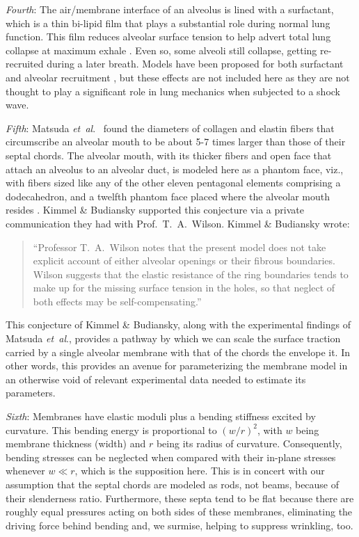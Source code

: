 \textit{Fourth\/}: The air\slash membrane interface of an alveolus is lined with a surfactant, which is a thin bi-lipid film that plays a substantial role during normal lung function.  This film reduces alveolar surface tension to help advert total lung collapse at maximum exhale \cite{Stamenovic90}.  Even so, some alveoli still collapse, getting re-recruited during a later breath.  Models have been proposed for both surfactant \cite{Hills99} and alveolar recruitment \cite{Bates07}, but these effects are not included here as they are not thought to play a significant role in lung mechanics when subjected to a shock wave. 

\textit{Fifth\/}: Matsuda \textit{et~al}.\ \cite{Matsudaetal87} found the diameters of collagen and elastin fibers that circumscribe an alveolar mouth to be about 5-7 times larger than those of their septal chords.  The alveolar mouth, with its thicker fibers and open face that attach an alveolus to an alveolar duct, is modeled here as a phantom face, viz., with fibers sized like any of the other eleven pentagonal elements comprising a dodecahedron, and a twelfth phantom face placed where the alveolar mouth resides \cite{Freedetal12}.  Kimmel \& Budiansky supported this conjecture via a private communication they had with Prof.\ T.\ A.\ Wilson.  Kimmel \& Budiansky wrote: \cite{KimmelBudiansky90}
\small
\begin{quote}
    ``Professor T.\ A.\ Wilson notes that the present model does not take explicit account of either alveolar openings or their fibrous boundaries.  Wilson suggests that the elastic resistance of the ring boundaries tends to make up for the missing surface tension in the holes, so that neglect of both effects may be self-compensating.''
\end{quote}
\normalsize
This conjecture of Kimmel \& Budiansky, along with the experimental findings of Matsuda \textit{et~al}., provides a pathway by which we can scale the surface traction carried by a single alveolar membrane with that of the chords the envelope it.  In other words, this provides an avenue for parameterizing the membrane model in an other\-wise void of relevant experimental data needed to estimate its parameters.

\textit{Sixth\/}: Membranes have elastic moduli plus a bending stiffness excited by curvature.  This bending energy is proportional to $(w/r)^2$, with $w$ being membrane thickness (width) and $r$ being its radius of curvature.  Consequently, bending stresses can be neglected when compared with their in-plane stresses whenever $w \ll r$, which is the supposition here.  This is in concert with our assumption that the septal chords are modeled as rods, not beams, because of their slenderness ratio.  Furthermore, these septa tend to be flat because there are roughly equal pressures acting on both sides of these membranes, eliminating the driving force behind bending \cite{HoppinHildebrandt77} and, we surmise, helping to suppress wrinkling, too.

